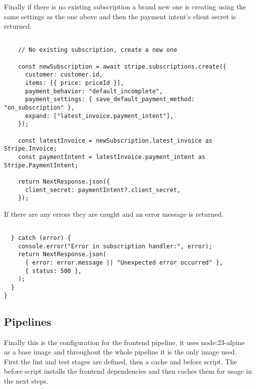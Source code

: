 \documentclass[]{project_report}
\begin{document}
Finally if there is no existing subscription a brand new one is creating using the same settings as the one above and then the payment intent's client secret is returned.
\begin{verbatim}

    // No existing subscription, create a new one

    const newSubscription = await stripe.subscriptions.create({
      customer: customer.id,
      items: [{ price: priceId }],
      payment_behavior: "default_incomplete",
      payment_settings: { save_default_payment_method: "on_subscription" },
      expand: ["latest_invoice.payment_intent"],
    });

    const latestInvoice = newSubscription.latest_invoice as Stripe.Invoice;
    const paymentIntent = latestInvoice.payment_intent as Stripe.PaymentIntent;

    return NextResponse.json({
      client_secret: paymentIntent?.client_secret,
    });

\end{verbatim}

If there are any errors they are caught and an error message is returned.
\begin{verbatim}

  } catch (error) {
    console.error("Error in subscription handler:", error);
    return NextResponse.json(
      { error: error.message || "Unexpected error occurred" },
      { status: 500 },
    );
  }
}
\end{verbatim}

\subsection{Pipelines}
Finally this is the configuration for the frontend pipeline, it uses node:23-alpine as a base image and throughout the whole pipeline it is the only image used. First the lint and test stages are defined, then a cache and before script. The before script installs the frontend dependencies and then caches them for usage in the next steps.
\end{document}

